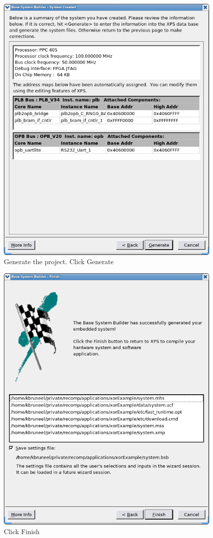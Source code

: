 \documentclass[a4paper,oneside]{memoir}
\begin{document}
\begin{figure}[H]
\centering
\includegraphics[scale=0.4]{BSB10}
\caption{Generate the project. Click Generate\label{fig:BSB10}}
\end{figure}
\begin{figure}[H]
\centering
\includegraphics[scale=0.4]{BSB11}
\caption{Click Finish\label{fig:BSB11}}
\end{figure}
\end{document}
